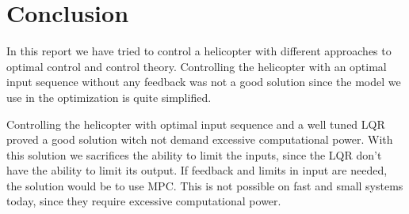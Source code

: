 \section{Conclusion}\label{sec:conclusion}
In this report we have tried to control a helicopter with different approaches to optimal control and control theory. Controlling the helicopter with an optimal input sequence without any feedback was not a good solution since the model we use in the optimization is quite simplified.

Controlling the helicopter with optimal input sequence and a well tuned LQR proved a good solution witch not demand excessive computational power. With this solution we sacrifices the ability to limit the inputs, since the LQR don't have the ability to limit its output. If feedback and limits in input are needed, the solution would be to use MPC. This is not possible on fast and small systems today, since they require excessive computational power.